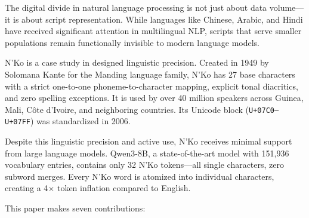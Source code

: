 \documentclass[11pt]{article}
\begin{document}
The digital divide in natural language processing is not just about data volume---it is about script representation.
While languages like Chinese, Arabic, and Hindi have received significant attention in multilingual NLP, scripts that serve smaller populations remain functionally invisible to modern language models.

N'Ko is a case study in designed linguistic precision.
Created in 1949 by Solomana Kante for the Manding language family, N'Ko has 27 base characters with a strict one-to-one phoneme-to-character mapping, explicit tonal diacritics, and zero spelling exceptions.
It is used by over 40 million speakers across Guinea, Mali, C\^{o}te d'Ivoire, and neighboring countries.
Its Unicode block (\texttt{U+07C0--U+07FF}) was standardized in 2006.

Despite this linguistic precision and active use, N'Ko receives minimal support from large language models.
Qwen3-8B, a state-of-the-art model with 151,936 vocabulary entries, contains only 32 N'Ko tokens---all single characters, zero subword merges.
Every N'Ko word is atomized into individual characters, creating a 4$\times$ token inflation compared to English.

This paper makes seven contributions:
\end{document}
